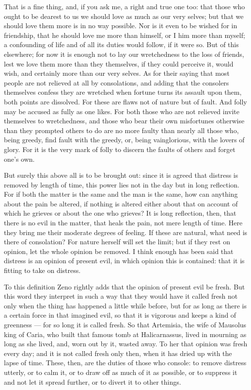  That is a fine thing, and, if you ask me, a right and true one too: that those who ought to be dearest to us we should love as much as our very selves; but that we should love them more is in no way possible. Nor is it even to be wished for in friendship, that he should love me more than himself, or I him more than myself; a confounding of life and of all its duties would follow, if it were so. But of this elsewhere; for now it is enough not to lay our wretchedness to the loss of friends, lest we love them more than they themselves, if they could perceive it, would wish, and certainly more than our very selves. As for their saying that most people are not relieved at all by consolations, and adding that the consolers themselves confess they are wretched when fortune turns its assault upon them, both points are dissolved. For these are flaws not of nature but of fault. And folly may be accused as fully as one likes. For both those who are not relieved invite themselves to wretchedness, and those who bear their own misfortunes otherwise than they prompted others to do are no more faulty than nearly all those who, being greedy, find fault with the greedy, or, being vainglorious, with the lovers of glory. For it is the very mark of folly to discern the faults of others and forget one's own.

 But surely this above all is to be brought out: since it is agreed that distress is removed by length of time, this power lies not in the day but in long reflection. For if both the matter is the same and the man is the same, how can anything about the pain be altered, if nothing is altered either about that on account of which he grieves or about the one who grieves? It is long reflection, then, that there is no evil in the matter, that heals the pain, not mere length of time. Here they bring me their moderate degrees of feeling. If these are natural, what need is there of consolation? For nature herself will set the limit; but if they rest on opinion, let the whole opinion be removed. I think enough has been said that distress is an opinion of present evil, in which opinion this is contained: that it is fitting to take on distress.

 To this definition Zeno rightly adds that the opinion of present evil be fresh. But this word they interpret in such a way that they would have it called fresh not only when the thing has happened a little while before, but for as long as there is a certain force in that imagined evil, so that it is vigorous and keeps a kind of greenness — for so long it is called fresh. So that Artemisia, the wife of Mausolus king of Caria, who built that famous tomb at Halicarnassus, lived in mourning as long as she lived, and, worn out by it, wasted away. To her that opinion was fresh every day; and it is not called fresh only then, when it has dried up with the lapse of time. These, then, are the duties of those who console: to remove distress utterly, or to calm it, or to draw off as much of it as possible, or to suppress it and not let it spread further, or to divert it to other things.

